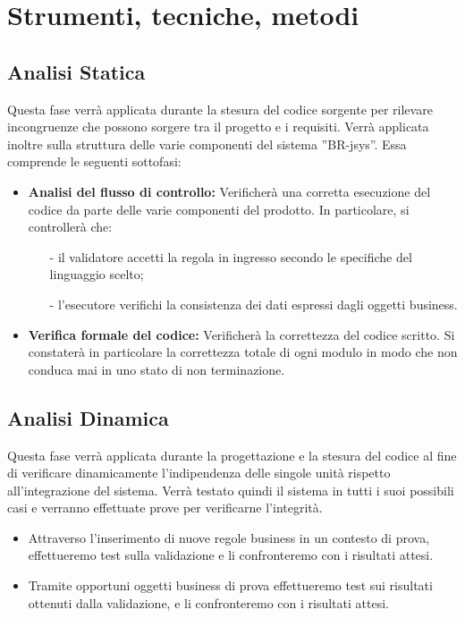\documentclass[11pt,titlepage,a4paper]{report}
\begin{document}
\section{Strumenti, tecniche, metodi}
\subsection{Analisi Statica}
Questa fase verr\`a applicata durante la stesura del codice sorgente per rilevare incongruenze che possono sorgere tra il progetto e i requisiti. Verr\`a applicata inoltre sulla struttura delle varie componenti del sistema ''BR-jsys''. Essa comprende le seguenti sottofasi:
\begin{itemize}
\item \textbf{Analisi del flusso di controllo:} Verificher\`a una corretta esecuzione del codice  da parte delle varie componenti del prodotto.
In particolare, si controller\`a che:
\begin{itemize}
\item[-]il validatore accetti la regola in ingresso secondo le specifiche del linguaggio scelto;
\item[-]l'esecutore verifichi la consistenza dei dati espressi dagli oggetti business.
\end{itemize}
\item \textbf{Verifica formale del codice:} Verificher\`a la correttezza del codice scritto. Si constater\`a in particolare la correttezza totale di ogni modulo in modo che non conduca mai in uno stato di non terminazione.
\end{itemize}

\subsection{Analisi Dinamica}
Questa fase verr\`a applicata durante la progettazione e la stesura del codice al fine di verificare dinamicamente l'indipendenza delle singole unit\`a rispetto all'integrazione del sistema. Verr\`a testato quindi il sistema in tutti i suoi possibili casi e verranno effettuate prove per verificarne l'integrit\`a.
\begin{itemize}
\item Attraverso l'inserimento di nuove regole business in un contesto di prova, effettueremo test sulla validazione e li confronteremo con i risultati attesi.
\item Tramite opportuni oggetti business di prova effettueremo test sui risultati ottenuti dalla validazione, e li confronteremo con i risultati attesi.
\end{itemize}
\end{document}

